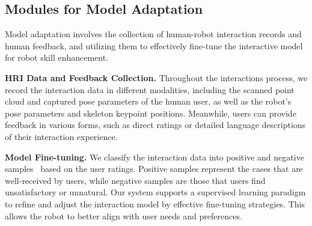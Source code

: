 
\subsection{Modules for Model Adaptation}

Model adaptation involves the collection of human-robot interaction records and human feedback, and utilizing them to effectively fine-tune the interactive model for robot skill enhancement.

\noindent\textbf{HRI Data and Feedback Collection.} Throughout the interactions process, we record the interaction data in different modalities, including the scanned point cloud and captured pose parameters of the human user, as well as the robot's pose parameters and skeleton keypoint positions. Meanwhile, users can provide feedback in various forms, such as direct ratings or detailed language descriptions of their interaction experience. 


\noindent\textbf{Model Fine-tuning.}
We classify the interaction data into positive and negative samples~\cite{zhu2025evolvinggrasp} based on the user ratings. Positive samples represent the cases that are well-received by users, while negative samples are those that users find unsatisfactory or unnatural. Our system supports a supervised learning paradigm to refine and adjust the interaction model by effective fine-tuning strategies. This allows the robot to better align with user needs and preferences. %

